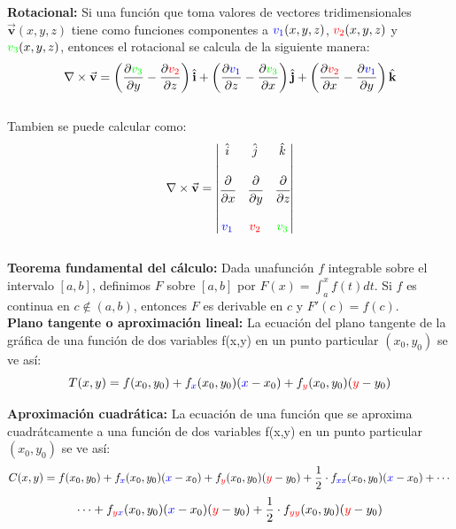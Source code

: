 \documentclass[12pt,a4paper]{article}
\begin{document}
 \textbf{Rotacional:} Si una función que toma valores de vectores tridimensionales  $\vec{\textbf{v}}(x,y,z)$ tiene como funciones componentes a $\textcolor{blue}{v_1}(x,y,z)$, $\textcolor{red}{v_2}(x,y,z)$ y $\textcolor{green}{v_3}(x,y,z)$, entonces el rotacional se calcula de la siguiente manera:
$$\nabla \times \vec{\textbf{v}}  = \left( \dfrac{\partial \textcolor{green}{v_3}}{\partial y}- \dfrac{\partial \textcolor{red}{v_2}}{\partial z} \right)\hat{\textbf{i}} + \left( \dfrac{\partial \textcolor{blue}{v_1}}{\partial z}-  \dfrac{\partial \textcolor{green}{v_3}}{\partial x} \right)\hat{\textbf{j}} + \left( \dfrac{\partial \textcolor{red}{v_2}}{\partial x}- \dfrac{\partial \textcolor{blue}{v_1}}{\partial y} \right)\hat{\textbf{k}} $$
\\
Tambien se puede calcular como:
$$\nabla\times \vec{\textbf{v}}=\left|
\begin{matrix} \hat i & \hat j & \hat k  \\ & & \\
\cfrac{\partial}{\partial x} & \cfrac{\partial}{\partial y} & \cfrac{\partial}{\partial z}
\\ & & \\ \textcolor{blue}{v_1} & \textcolor{red}{v_2} & \textcolor{green}{v_3}  \end{matrix}\right|$$
\\


\textbf{Teorema fundamental del cálculo:} Dada unafunción $f$ integrable sobre el intervalo $ [a,b]$, definimos $F$ sobre $[a,b]$ por $F(x) = {\int_{a}^x f(t)dt}$. Si $f$ es continua en $c \notin (a,b)$, entonces $F$ es derivable en $c$ y $F'(c) = f(c)$.\\

\textbf{Plano tangente o aproximación lineal:} La ecuación del plano tangente de la gráfica de una función de dos variables f(x,y) en un punto particular $(x_0, y_0)$ se ve así:
$$T(x, y) = f(x_0, y_0) + {f_{\textcolor{blue}{x}}(x_0, y_0)}(\textcolor{blue}{x}-x_0) + {f_{\textcolor{red}{y}}(x_0, y_0)}(\textcolor{red}{y}-y_0) $$

\textbf{Aproximación cuadrática:} La ecuación de una función que se aproxima cuadrátcamente a una función de dos variables f(x,y) en un punto particular $(x_0, y_0)$ se ve así:
$$ C(x, y) = f(x_0, y_0) + {f_{\textcolor{blue}{x}}(x_0, y_0)}(\textcolor{blue}{x}-x_0) + {f_{\textcolor{red}{y}}(x_0, y_0)}(\textcolor{red}{y}-y_0)+\frac{1}{2} \cdot f_{\textcolor{blue}{xx}}(x_0, y_0)(\textcolor{blue}{x}-x_0)+ \cdots $$
  $$\cdots + f_{\textcolor{red}{y}\textcolor{blue}{x}}(x_0, y_0)(\textcolor{blue}{x}-x_0)(\textcolor{red}{y}-y_0)+ \frac{1}{2} \cdot {f_{\textcolor{red}{yy}}(x_0, y_0)}(\textcolor{red}{y}-y_0) $$
\end{document}
